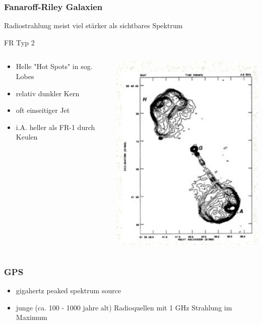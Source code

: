 \documentclass[aspectratio=1610, 9pt]{beamer}
\begin{document}
\begin{frame}\frametitle{Fanaroff-Riley Galaxien}
Radiostrahlung meist viel st\"arker als sichtbares Spektrum
  \begin{block}{FR Typ 2}
  \begin{columns}
  \begin{column}[c]{0.45\linewidth}
    \begin{itemize}
      \item Helle "Hot Spots" in sog. Lobes
      \item relativ dunkler Kern
      \item oft einseitiger Jet
      \item i.A. heller als FR-1 durch Keulen
    \end{itemize}
  \end{column}
  \begin{column}[c]{0.45\linewidth}
    \includegraphics{images/FR2.png}
  \end{column}
  \end{columns}
  \end{block}
\end{frame}

\begin{frame}\frametitle{GPS}
  \begin{itemize}
    \item gigahertz peaked spektrum source
    \item junge (ca. 100 - 1000 jahre alt) Radioquellen mit 1 GHz Strahlung im Maximum
  \end{itemize}
\end{frame}
\end{document}
